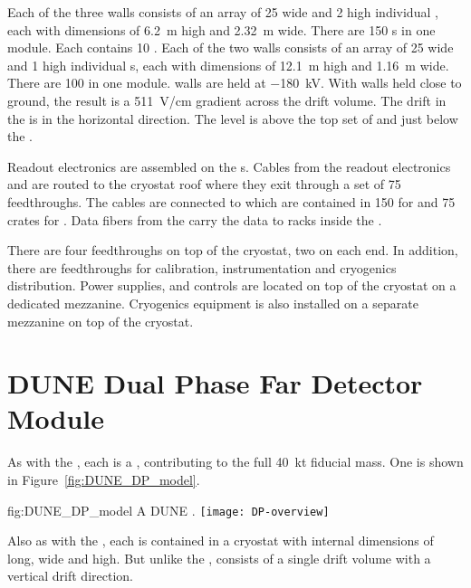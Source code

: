 Each of the three  walls consists of an array of \num{25}
wide and \num{2} high individual , each with dimensions
of \SI{6.2}{\meter} high and \SI{2.32}{\meter} wide. There are
\num{150} s in one module. Each  contains
\num{10} . Each of the two  walls consists of an
array of \num{25} wide and \num{1} high individual s, each
with dimensions of \SI{12.1}{\meter} high and \SI{1.16}{\meter}
wide. There are \num{100}  in one module.  
walls are held at $-$\SI{180}{\kilo\volt}. With  walls held
close to ground, the result is a \SI{511}{\volt/\centi\meter} gradient
across the drift volume. The drift in the  is in the horizontal 
direction. The  level is above the top set of  and just
below the .

Readout electronics are assembled on the s. Cables from the
readout electronics and  are routed to the cryostat roof
where they exit through a set of \num{75} feedthroughs. The cables are
connected to  which are contained in \num{150}
 for  and \num{75} crates for . Data
fibers from the  carry the data to  racks
inside the .

There are four  feedthroughs on top of the cryostat, two on
each end. In addition, there are feedthroughs for calibration,
instrumentation and cryogenics distribution. Power supplies, and
controls are located on top of the cryostat on a dedicated
mezzanine. Cryogenics equipment is also installed on a separate
mezzanine on top of the cryostat.

\section{DUNE Dual Phase Far Detector Module}
\label{sec:fdsp-DP-module}

As with the , each  is a \nominalmodsize {},
contributing to the full \SI{40}{\kilo\tonne}  fiducial
mass.  One \nominalmodsize {} is shown in
Figure~\ref{fig:DUNE_DP_model}.
\begin{dunefigure}{fig:DUNE_DP_model} {A \nominalmodsize DUNE 
    .}
  \texttt{[image: DP-overview]}
\end{dunefigure} 

Also as with the , each  is contained in a
cryostat with internal dimensions of \cryostatlen %
long,
\cryostatwdth %
wide and \cryostatht %
high. But unlike the
,  consists of a single drift volume with
a vertical drift direction.


